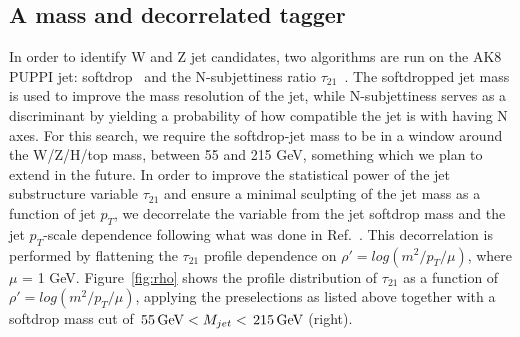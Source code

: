 \subsection{A mass and \PT decorrelated tagger}
\label{sec:searchIII:ddt}
In order to identify W and Z jet candidates, two algorithms are run on the AK8 PUPPI jet: softdrop~\cite{softdrop} and the N-subjettiness ratio $\tau_{21}$~\cite{nsubjettiness}.
The softdropped jet mass is used to improve the mass resolution of the jet, while N-subjettiness serves as a discriminant by yielding a probability of how compatible the jet is with having N axes. For this search, we require the softdrop-jet mass to be in a window around the W/Z/H/top mass, between 55 and 215 GeV, something which we plan to extend in the future. In order to improve the statistical power of the jet substructure variable $\tau_{21}$ and ensure a minimal sculpting of the jet mass as a function of jet $p_T$,
we decorrelate the variable from the jet softdrop mass and the jet $p_T$-scale dependence following what was done in Ref.~\cite{ddt}.
This decorrelation is performed by flattening the $\tau_{21}$ profile dependence on $\rho' = log(m^2/p_T/\mu)$, where $\mu$ = 1 GeV.
Figure~\ref{fig:rho} shows the profile distribution of $\tau_{21}$ as a function of $\rho' = log(m^2/p_T/\mu)$, applying the preselections as listed above together with a softdrop mass cut of $\text{\,55}{\ensuremath{\,\text{Ge\hspace{-.08em}V}}} < M_{jet} < \text{\,215}{\ensuremath{\,\text{Ge\hspace{-.08em}V}}}$ (right).
